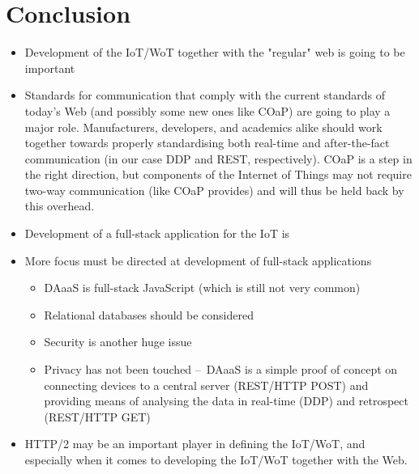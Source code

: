 \section{Conclusion}
\begin{itemize}
  \item Development of the IoT/WoT together with the "regular" web is going to be important
  \item Standards for communication that comply with the current standards of today's Web (and possibly some new ones like COaP) are going to play a major role. Manufacturers, developers, and academics alike should work together towards properly standardising both real-time and after-the-fact communication (in our case DDP and REST, respectively). COaP is a step in the right direction, but components of the Internet of Things may not require two-way communication (like COaP provides) and will thus be held back by this overhead.
  \item Development of a full-stack application for the IoT is 
  \item More focus must be directed at development of full-stack applications
  \begin{itemize}
      \item DAaaS is full-stack JavaScript (which is still not very common)
      \item Relational databases should be considered
      \item Security is another huge issue
      \item Privacy has not been touched – DAaaS is a simple proof of concept on connecting devices to a central server (REST/HTTP POST) and providing means of analysing the data in real-time (DDP) and retrospect (REST/HTTP GET)
  \end{itemize}
  \item HTTP/2 may be an important player in defining the IoT/WoT, and especially when it comes to developing the IoT/WoT together with the Web.
\end{itemize}
